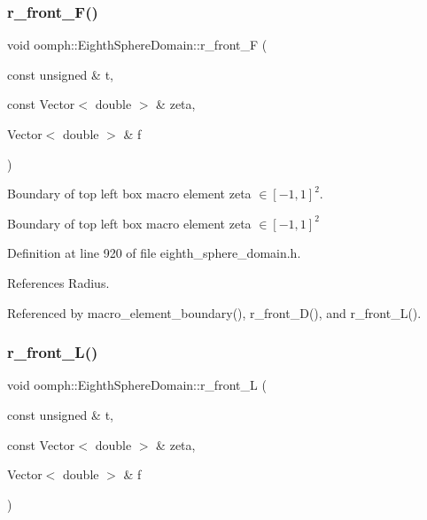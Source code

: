 \subsubsection{\texorpdfstring{r\+\_\+front\+\_\+\+F()}{r\_front\_F()}}
{\footnotesize\ttfamily void oomph\+::\+Eighth\+Sphere\+Domain\+::r\+\_\+front\+\_\+F (\begin{DoxyParamCaption}\item[{const unsigned \&}]{t,  }\item[{const Vector$<$ double $>$ \&}]{zeta,  }\item[{Vector$<$ double $>$ \&}]{f }\end{DoxyParamCaption})\hspace{0.3cm}{\ttfamily [private]}}



Boundary of top left box macro element zeta $ \in [-1,1]^2 $. 

Boundary of top left box macro element zeta $ \in [-1,1]^2 $ 

Definition at line 920 of file eighth\+\_\+sphere\+\_\+domain.\+h.



References Radius.



Referenced by macro\+\_\+element\+\_\+boundary(), r\+\_\+front\+\_\+\+D(), and r\+\_\+front\+\_\+\+L().

\mbox{\label{classoomph_1_1EighthSphereDomain_a161d1ad8c0e991e9228a0725d7c9ccd9}} 
\subsubsection{\texorpdfstring{r\+\_\+front\+\_\+\+L()}{r\_front\_L()}}
{\footnotesize\ttfamily void oomph\+::\+Eighth\+Sphere\+Domain\+::r\+\_\+front\+\_\+L (\begin{DoxyParamCaption}\item[{const unsigned \&}]{t,  }\item[{const Vector$<$ double $>$ \&}]{zeta,  }\item[{Vector$<$ double $>$ \&}]{f }\end{DoxyParamCaption})\hspace{0.3cm}{\ttfamily [private]}}



